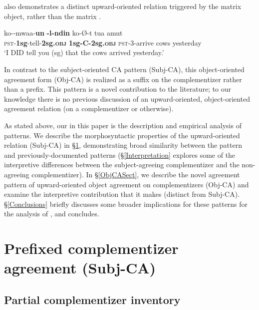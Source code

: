 \documentclass[output=paper
,newtxmath
,modfonts
,nonflat]{langsci/langscibook}
\begin{document}
 also demonstrates a distinct upward-oriented  relation triggered by the matrix object, rather than the matrix .

\ea
\gll ko-\textbf{}-mwaa-\textbf{un} \textbf{-l\textepsilon{}-nd\textyogh{}in} ko-\O-\textsci{}t tua amut \\
\textsc{pst}-\textbf{1sg}-tell-\textbf{2sg.\textsc{obj}} \textbf{1sg-C-2sg.\textsc{obj}} \textsc{pst}-3-arrive cows yesterday \\
\glt `I DID tell you (sg) that the cows arrived yesterday.'
\z

In contrast to the subject-oriented CA pattern (Subj-CA), this object-oriented agreement form (Obj-CA) is realized as a suffix on the complementizer rather than a prefix. This pattern is a novel contribution to the literature; to our knowledge there is no previous discussion of an upward-oriented, object-oriented agreement relation (on a complementizer or otherwise). 

As stated above, our  in this paper is the  description and empirical analysis of   patterns. We describe the morphosyntactic properties of the upward-oriented   relation (Subj-CA) in \S \ref{sec:Diercks,Rao:2}, demonstrating broad similarity between the  pattern and previously-documented patterns (\S \ref{Interpretation} explores some of the interpretive differences between the subject-agreeing complementizer and the non-agreeing complementizer). In \S \ref{ObjCASect}, we describe the novel agreement pattern of upward-oriented object agreement on complementizers (Obj-CA) and examine the interpretive contribution that it makes (distinct from Subj-CA). \S \ref{Conclusions} briefly discusses some broader implications for these patterns for the analysis of , and concludes.


\section{Prefixed complementizer agreement (Subj-CA)} \label{sec:Diercks,Rao:2}

\subsection{Partial complementizer inventory}
\end{document}
